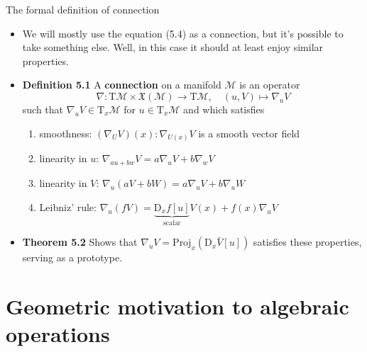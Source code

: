 \documentclass{beamer}
\begin{document}
\begin{frame}{The formal definition of connection}
    \begin{itemize}
        \item We will mostly use the equation (5.4) as a connection, but it's possible to take something else. Well, in this case it should at least enjoy similar properties.
        \item \textbf{Definition 5.1} A {\color{blue}\textbf{connection}} on a manifold $\mathcal{M}$ is an operator 
        \begin{equation}
            \nabla : \text{T}\mathcal{M} \times \mathfrak{X}(\mathcal{M}) \to \text{T} \mathcal{M}, \quad (u, V) \mapsto \nabla_u V
        \end{equation}
        such that $\nabla_u V \in \text{T}_x \mathcal{M}$ for $u \in \text{T}_x \mathcal{M}$ and which satisfies 
        \begin{enumerate}
            \item smoothness: $(\nabla_U V)(x) : \nabla_{U(x)}V$ is a smooth vector field 
            \item linearity in $u$: $\nabla_{au+bw}V = a\nabla_u V + b \nabla_w V$
            \item linearity in $V$: $\nabla_{u}(aV+bW) = a\nabla_u V + b \nabla_u W$
            \item Leibniz' rule: $\nabla_u(fV) = \underbrace{\text{D}_x f[u]}_{\text{scalar}}  V(x) + f(x) \nabla_u V$
        \end{enumerate}
        \item \textbf{Theorem 5.2} Shows that $\nabla_u V = \text{Proj}_x(\text{D}_x\bar{V}[u])$ satisfies these properties, serving as a prototype. 
    \end{itemize}
\end{frame}


\section{Geometric motivation to algebraic operations}
\end{document}
